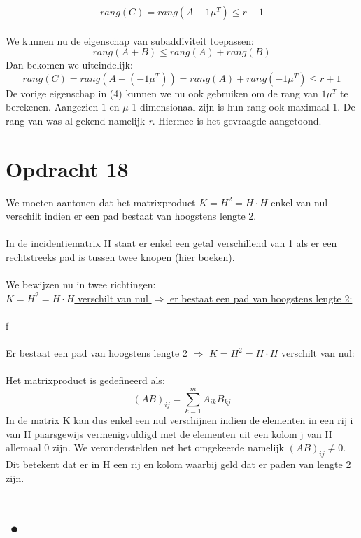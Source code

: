 \documentclass[11pt,a4paper]{article}
\begin{document}
$$ rang(C) = rang\left(A-1\mu^T\right) \leq r + 1$$
\\
We kunnen nu de eigenschap van subaddiviteit toepassen:
\begin{equation}
rang(A+B) \leq rang(A) + rang(B)
\end{equation} 
Dan bekomen we uiteindelijk:
$$  rang(C) = rang\left(A+(-1\mu^T)\right) = rang(A) + rang(-1\mu^T) \leq r + 1$$
De vorige eigenschap in (4) kunnen we nu ook gebruiken om de rang van $1\mu^T$ te berekenen. Aangezien $1$ en $\mu$ 1-dimensionaal zijn is hun rang ook maximaal 1. De rang van was al gekend namelijk \textit{r}. Hiermee is het gevraagde aangetoond.

\section*{Opdracht 18}

We moeten aantonen dat het matrixproduct $K = H^2 = H\cdot H$ enkel van nul verschilt indien er een pad bestaat van hoogstens lengte 2.
\\
\\
In de incidentiematrix H staat er enkel een getal verschillend van 1 als er een rechtstreeks pad is tussen twee knopen (hier boeken).
\\
\\
We bewijzen nu in twee richtingen:\\
\underline{$K = H^2 = H\cdot H$ verschilt van nul $\Rightarrow$ er bestaat een pad van hoogstens lengte 2:}
\\
\\
f
\\
\\
\underline{Er bestaat een pad van hoogstens lengte 2 $\Rightarrow$ $K = H^2 = H\cdot H$ verschilt van nul:}
\\
\\
Het matrixproduct is gedefineerd als:
$$(AB)_{ij} = \sum_{k=1}^mA_{ik}B_{kj}$$
In de matrix K kan dus enkel een nul verschijnen indien de elementen in een rij i van H paarsgewijs vermenigvuldigd met de elementen uit een kolom j van H allemaal 0 zijn. We veronderstelden net het omgekeerde namelijk $(AB)_{ij} \neq 0$. Dit betekent dat er in H een rij en kolom waarbij geld dat er paden van lengte 2 zijn.

\section{•}
\end{document}
